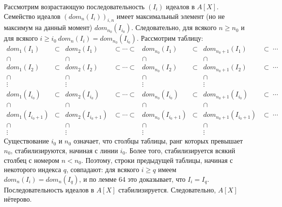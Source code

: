 \begin{myproof}
Рассмотрим возрастающую последовательность $(I_{i})$ идеалов в $A[X]$. Семейство идеалов $(dom_{n}(I_{i}))_{i,n}$ имеет максимальный элемент (но не максимум на данный момент) $dom_{n_{0}}(I_{i_{0}})$. Следовательно, для всякого $n\geqslant n_{0}$ и для всякого $i\geqslant i_{0}\:dom_{n}(I_{i})=dom_{n_{0}}(I_{i_{0}})$. Рассмотрим таблицу:
$$\begin{array}{cccccccc}
dom_{1}(I_{1}) & \subset & dom_{2}(I_{1}) & \subset\cdots\subset & dom_{n_{0}}(I_{1}) & \subset & dom_{n_{0}+1}(I_{1})&\subset\;\cdots\\
\cap&&\cap&&\cap&&\cap&\\
dom_{1}(I_{2}) & \subset & dom_{2}(I_{2}) & \subset\cdots\subset & dom_{n_{0}}(I_{2}) & \subset & dom_{n_{0}+1}(I_{2})&\subset\;\cdots\\
\cap&&\cap&&\cap&&\cap&\\
\vdots&&\vdots&&\vdots&&\vdots&\\
dom_{1}(I_{i_{0}}) & \subset & dom_{2}(I_{i_{0}}) & \subset\cdots\subset & dom_{n_{0}}(I_{i_{0}}) & \subset & dom_{n_{0}+1}(I_{i_{0}})&\subset\;\cdots\\
\cap&&\cap&&\cap&&\cap&\\
dom_{1}(I_{i_{0}+1}) & \subset & dom_{2}(I_{i_{0}+1}) & \subset\cdots\subset & dom_{n_{0}}(I_{i_{0}+1}) & \subset & dom_{n_{0}+1}(I_{i_{0}+1})&\subset\;\cdots\\
\cap&&\cap&&\cap&&\cap&\\
\vdots&&\vdots&&\vdots&&\vdots&
\end{array}$$
Существование $i_{0}$ и $n_{0}$ означает, что столбцы таблицы, ранг которых превышает $n_{0}$, стабилизируются, начиная с линии $i_{0}$. Более того, стабилизируется всякий столбец с номером $n<n_{0}$. Поэтому, строки предыдущей таблицы, начиная с некоторого индекса $q$, совпадают: для всякого $i\geqslant q$ имеем $dom_{n}(I_{i})=dom_{n}(I_{q})$, и по лемме 64 это доказыва­ет, что $I_{i}=I_{q}$. Последовательность идеалов в $A[X]$ стабилизируется. Следовательно, $A[X]$ нётерово.
\end{myproof}


